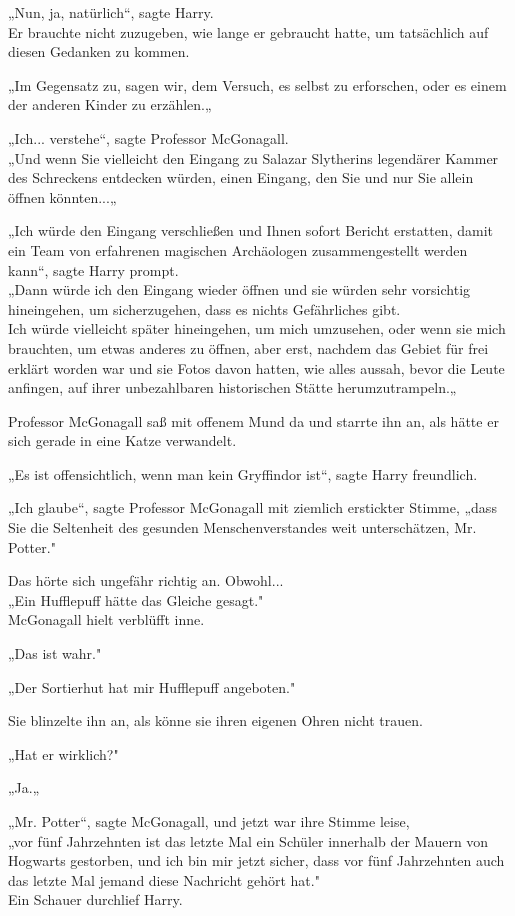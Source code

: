 {„Nun, ja, natürlich“, sagte Harry.\\ Er brauchte nicht zuzugeben, wie lange er gebraucht hatte, um tatsächlich auf diesen Gedanken zu kommen.

„Im Gegensatz zu, sagen wir, dem Versuch, es selbst zu erforschen, oder es einem der anderen Kinder zu erzählen.„

„Ich... verstehe“, sagte Professor McGonagall.\\ „Und wenn Sie vielleicht den Eingang zu Salazar Slytherins legendärer Kammer des Schreckens entdecken würden, einen Eingang, den Sie und nur Sie allein öffnen könnten...„

„Ich würde den Eingang verschließen und Ihnen sofort Bericht erstatten, damit ein Team von erfahrenen magischen Archäologen zusammengestellt werden kann“, sagte Harry prompt.\\ „Dann würde ich den Eingang wieder öffnen und sie würden sehr vorsichtig hineingehen, um sicherzugehen, dass es nichts Gefährliches gibt.\\ Ich würde vielleicht später hineingehen, um mich umzusehen, oder wenn sie mich brauchten, um etwas anderes zu öffnen, aber erst, nachdem das Gebiet für frei erklärt worden war und sie Fotos davon hatten, wie alles aussah, bevor die Leute anfingen, auf ihrer unbezahlbaren historischen Stätte herumzutrampeln.„

Professor McGonagall saß mit offenem Mund da und starrte ihn an, als hätte er sich gerade in eine Katze verwandelt.

„Es ist offensichtlich, wenn man kein Gryffindor ist“, sagte Harry freundlich.

„Ich glaube“, sagte Professor McGonagall mit ziemlich erstickter Stimme, „dass Sie die Seltenheit des gesunden Menschenverstandes weit unterschätzen, Mr. Potter."

Das hörte sich ungefähr richtig an. Obwohl...\\ „Ein Hufflepuff hätte das Gleiche gesagt."\\ McGonagall hielt verblüfft inne.

„Das ist wahr."

„Der Sortierhut hat mir Hufflepuff angeboten."

Sie blinzelte ihn an, als könne sie ihren eigenen Ohren nicht trauen.

„Hat er wirklich?"

„Ja.„

„Mr. Potter“, sagte McGonagall, und jetzt war ihre Stimme leise,\\ „vor fünf Jahrzehnten ist das letzte Mal ein Schüler innerhalb der Mauern von Hogwarts gestorben, und ich bin mir jetzt sicher, dass vor fünf Jahrzehnten auch das letzte Mal jemand diese Nachricht gehört hat."\\ Ein Schauer durchlief Harry.

}
